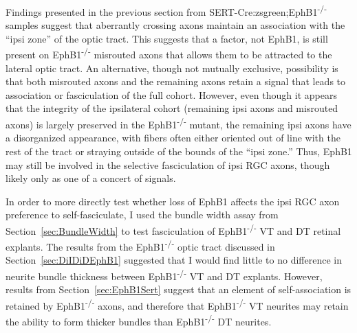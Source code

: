 \label{sec:EphB1invitro}
Findings presented in the previous section from SERT-Cre:zsgreen;EphB1\textsuperscript{-/-} samples suggest that aberrantly crossing axons maintain an association with the ``ipsi zone'' of the optic tract.
This suggests that a factor, not EphB1, is still present on EphB1\textsuperscript{-/-} misrouted axons that allows them to be attracted to the lateral optic tract.
An alternative, though not mutually exclusive, possibility is that both misrouted axons and the remaining axons retain a signal that leads to association or fasciculation of the full cohort.
However, even though it appears that the integrity of the ipsilateral cohort (remaining ipsi axons and misrouted axons) is largely preserved in the EphB1\textsuperscript{-/-} mutant, the remaining ipsi axons have a disorganized appearance, with fibers often either oriented out of line with the rest of the tract or straying outside of the bounds of the ``ipsi zone.''
Thus, EphB1 may still be involved in the selective fasciculation of ipsi RGC axons, though likely only as one of a concert of signals.

In order to more directly test whether loss of EphB1 affects the ipsi RGC axon preference to self-fasciculate, I used the \invitro{} bundle width assay from Section~\ref{sec:BundleWidth} to test fasciculation of EphB1\textsuperscript{-/-} VT and DT retinal explants.
The \invivo{} results from the EphB1\textsuperscript{-/-} optic tract discussed in Section~\ref{sec:DiIDiDEphB1} suggested that I would find little to no difference in neurite bundle thickness between EphB1\textsuperscript{-/-} VT and DT explants.
However, results from Section~\ref{sec:EphB1Sert} suggest that an element of self-association is retained by EphB1\textsuperscript{-/-} axons, and therefore that EphB1\textsuperscript{-/-} VT neurites may retain the ability to form thicker bundles than EphB1\textsuperscript{-/-} DT neurites.

